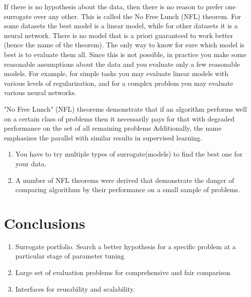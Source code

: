         If there is no hypothesis about the data, then there is no reason to prefer one surrogate over any other. This is called the No Free Lunch (NFL) theorem. For some datasets the best
        model is a linear model, while for other datasets it is a neural network. There is no model that is a priori guaranteed to work better (hence the name of the theorem). 
        The only way to know for sure which model is best is to evaluate them all. Since this is not possible, in practice you make some reasonable assumptions about the data 
        and you evaluate only a few reasonable models. For example, for simple tasks you may evaluate linear models with various levels of regularization, 
        and for a complex problem you may evaluate various neural networks.

        "No Free Lunch" (NFL) theorems demonstrate that if an algorithm performs well on a certain class of problems then it necessarily pays for that with degraded performance on the set of 
        all remaining problems Additionally, the name emphasizes the parallel with similar results in supervised learning.
        \begin{enumerate}
            \item You have to try multiple types of surrogate(models) to find the best one for your data.
            \item A number of NFL theorems were derived that demonstrate the danger of comparing algorithms by their performance on a small sample of problems.
        \end{enumerate}


    \section{Conclusions}
        
        \begin{enumerate}
            \item Surrogate portfolio. Search a better hypothesis for a specific problem at a particular stage of parameter tuning
            \item Large set of evaluation problems for comprehensive and fair comparison
            \item Interfaces for reusability and scalability. 
        \end{enumerate}
    

